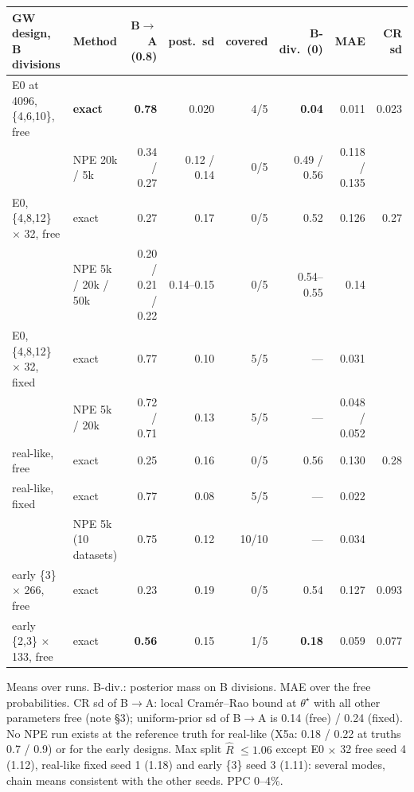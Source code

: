 \documentclass[10pt,a4paper]{article}
\newcommand{\code}[1]{\texttt{\detokenize{#1}}}
\begin{document}
\begin{center}\footnotesize\setlength{\tabcolsep}{3pt}
\begin{tabular}{@{}llrrrrrr@{}}\toprule
GW design, B divisions & Method & B$\to$A (0.8) & post.\ sd & covered & B-div.\ (0) & MAE & CR sd \\\midrule
E0 at 4096, \{4,6,10\}, free & \textbf{exact} & \textbf{0.78} & 0.020 & 4/5 & \textbf{0.04} & 0.011 & 0.023 \\
 & NPE 20k / 5k & 0.34 / 0.27 & 0.12 / 0.14 & 0/5 & 0.49 / 0.56 & 0.118 / 0.135 & \\
E0, \{4,8,12\} $\times$ 32, free & exact & 0.27 & 0.17 & 0/5 & 0.52 & 0.126 & 0.27 \\
 & NPE 5k / 20k / 50k & 0.20 / 0.21 / 0.22 & 0.14--0.15 & 0/5 & 0.54--0.55 & 0.14 & \\
E0, \{4,8,12\} $\times$ 32, fixed & exact & 0.77 & 0.10 & 5/5 & --- & 0.031 & \\
 & NPE 5k / 20k & 0.72 / 0.71 & 0.13 & 5/5 & --- & 0.048 / 0.052 & \\
real-like, free & exact & 0.25 & 0.16 & 0/5 & 0.56 & 0.130 & 0.28 \\
real-like, fixed & exact & 0.77 & 0.08 & 5/5 & --- & 0.022 & \\
 & NPE 5k (10 datasets) & 0.75 & 0.12 & 10/10 & --- & 0.034 & \\
early \{3\} $\times$ 266, free & exact & 0.23 & 0.19 & 0/5 & 0.54 & 0.127 & 0.093 \\
early \{2,3\} $\times$ 133, free & exact & \textbf{0.56} & 0.15 & 1/5 & \textbf{0.18} & 0.059 & 0.077 \\\bottomrule
\end{tabular}

Means over runs. B-div.: posterior mass on B divisions. MAE over the free probabilities. CR sd of B$\to$A: local Cram\'er--Rao bound at $\theta^\star$ with all other parameters free (note \S3); uniform-prior sd of B$\to$A is 0.14 (free) / 0.24 (fixed). No NPE run exists at the reference truth for real-like \code{two_type} (X5a: 0.18 / 0.22 at truths 0.7 / 0.9) or for the early designs. Max split $\hat R$ $\le 1.06$ except E0 $\times$ 32 free seed 4 (1.12), real-like fixed seed 1 (1.18) and early \{3\} seed 3 (1.11): several modes, chain means consistent with the other seeds. PPC 0--4\%.
\end{center}
\end{document}
